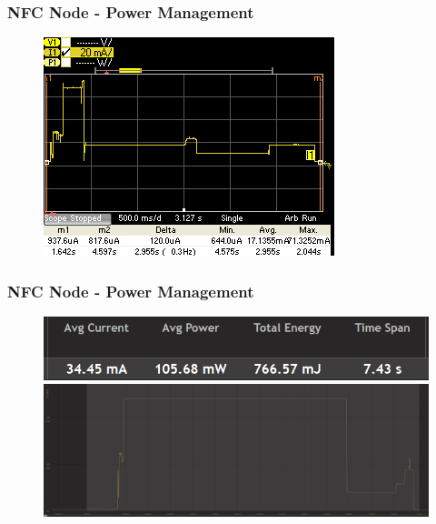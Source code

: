 \begin{frame}[fragile]
\frametitle{NFC Node - Power Management} 
\begin{figure}
  \centering
	\includegraphics[width=\textwidth]{images/Mobile9.jpg}
\end{figure}
\end{frame}

\begin{frame}[fragile]
\frametitle{NFC Node - Power Management} 
\begin{figure}
  \centering
  \includegraphics[width=.5\textwidth]{images/NFC16.png} \\
	\includegraphics[width=\textwidth]{images/NFC14.png}
\end{figure}
\end{frame}

